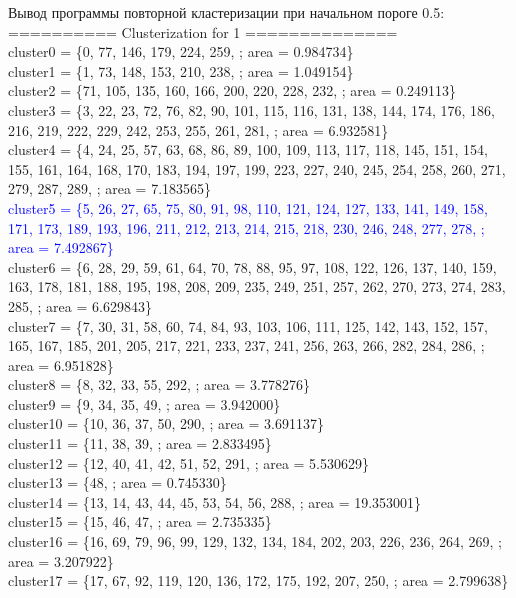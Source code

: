 \documentclass[a4paper,12pt, titlepage]{article}
\begin{document}
\newpage
\noindent 
Вывод программы повторной кластеризации при начальном пороге 0.5:\\
==========  Clusterization for 1 ==============\\
cluster0 = \{0, 77, 146, 179, 224, 259, ; area = 0.984734\}\\
cluster1 = \{1, 73, 148, 153, 210, 238, ; area = 1.049154\}\\
cluster2 = \{71, 105, 135, 160, 166, 200, 220, 228, 232, ; area = 0.249113\}\\
cluster3 = \{3, 22, 23, 72, 76, 82, 90, 101, 115, 116, 131, 138, 144, 174, 176, 186, 216, 219, 222, 229, 242, 253, 255, 261, 281, ; area = 6.932581\}\\
cluster4 = \{4, 24, 25, 57, 63, 68, 86, 89, 100, 109, 113, 117, 118, 145, 151, 154, 155, 161, 164, 168, 170, 183, 194, 197, 199, 223, 227, 240, 245, 254, 258, 260, 271, 279, 287, 289, ; area = 7.183565\}\\
\textcolor{blue}
{
cluster5 = \{5, 26, 27, 65, 75, 80, 91, 98, 110, 121, 124, 127, 133, 141, 149, 158, 171, 173, 189, 193, 196, 211, 212, 213, 214, 215, 218, 230, 246, 248, 277, 278, ; area = 7.492867\}\\
}
cluster6 = \{6, 28, 29, 59, 61, 64, 70, 78, 88, 95, 97, 108, 122, 126, 137, 140, 159, 163, 178, 181, 188, 195, 198, 208, 209, 235, 249, 251, 257, 262, 270, 273, 274, 283, 285, ; area = 6.629843\}\\
cluster7 = \{7, 30, 31, 58, 60, 74, 84, 93, 103, 106, 111, 125, 142, 143, 152, 157, 165, 167, 185, 201, 205, 217, 221, 233, 237, 241, 256, 263, 266, 282, 284, 286, ; area = 6.951828\}\\
cluster8 = \{8, 32, 33, 55, 292, ; area = 3.778276\}\\
cluster9 = \{9, 34, 35, 49, ; area = 3.942000\}\\
cluster10 = \{10, 36, 37, 50, 290, ; area = 3.691137\}\\
cluster11 = \{11, 38, 39, ; area = 2.833495\}\\
cluster12 = \{12, 40, 41, 42, 51, 52, 291, ; area = 5.530629\}\\
cluster13 = \{48, ; area = 0.745330\}\\
cluster14 = \{13, 14, 43, 44, 45, 53, 54, 56, 288, ; area = 19.353001\}\\
cluster15 = \{15, 46, 47, ; area = 2.735335\}\\
cluster16 = \{16, 69, 79, 96, 99, 129, 132, 134, 184, 202, 203, 226, 236, 264, 269, ; area = 3.207922\}\\
cluster17 = \{17, 67, 92, 119, 120, 136, 172, 175, 192, 207, 250, ; area = 2.799638\}\\
\end{document}
